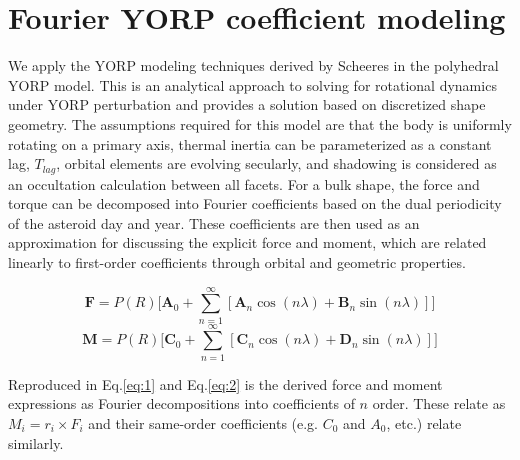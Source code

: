 \section{Fourier YORP coefficient modeling}
We apply the YORP modeling techniques derived by Scheeres in the polyhedral YORP model. This is an analytical approach to solving for rotational dynamics under YORP perturbation and provides a solution based on discretized shape geometry. The assumptions required for this model are that the body is uniformly rotating on a primary axis, thermal inertia can be parameterized as a constant lag, $T_{lag}$, orbital elements are evolving secularly, and shadowing is considered as an occultation calculation between all facets. For a bulk shape, the force and torque can be decomposed into Fourier coefficients based on the dual periodicity of the asteroid day and year. These coefficients are then used as an approximation for discussing the explicit force and moment, which are related linearly to first-order coefficients through orbital and geometric properties. 


\begin{equation} \label{eq:1}
    \textbf{F} = P(R) \Big[ \textbf{A}_0 + \sum_{n=1}^{\infty} [ \textbf{A}_n \cos(n\lambda) + \textbf{B}_n \sin(n\lambda) ]\Big]
\end{equation}
\begin{equation} \label{eq:2}
    \textbf{M} = P(R) \Big[ \textbf{C}_0 + \sum_{n=1}^{\infty} [ \textbf{C}_n \cos(n\lambda) + \textbf{D}_n \sin(n\lambda) ]\Big]
\end{equation}

Reproduced in Eq.\ref{eq:1} and Eq.\ref{eq:2} is the derived force and moment expressions as Fourier decompositions into coefficients of $n$ order. These relate as $M_i = r_i \times F_i$ and their same-order coefficients (e.g. $C_0$ and $A_0$, etc.) relate similarly. 

